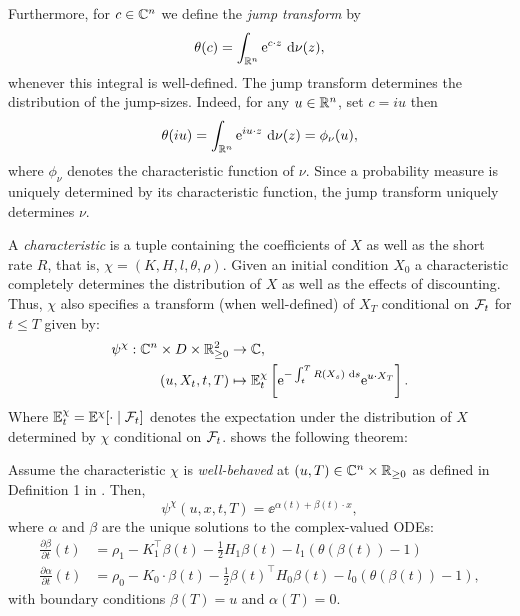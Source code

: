 Furthermore, for $c \in \mathbb{C}^{n}$ we define the \emph{jump transform} by
\begin{equation}
  \theta(c) = \int_{\mathbb{R}^{n}}
  \text{e}^{c \cdot z}\text{ d} \nu(z)
  \label{eq:jump-trans-def}
,\end{equation}
whenever this integral is well-defined. The jump transform determines the
distribution of the jump-sizes. Indeed, for any $u \in \mathbb{R}^n$, set $c = iu$ then 
\[
  \theta(iu)
  = \int_{\mathbb{R}^n} \text{e}^{iu \cdot z} \text{ d}\nu(z)
  = \phi_\nu(u),
\]
where $\phi_\nu$ denotes the characteristic function of $\nu$. Since a probability measure is
uniquely determined by its characteristic function, the jump transform uniquely determines $\nu$.

A \emph{characteristic} is a tuple containing the coefficients of $X$ as well as the short rate $R$,
that is, $\chi = (K, H, l, \theta, \rho)$. Given an initial condition $X_0$ a characteristic
completely determines the distribution of $X$ as well as the effects of discounting. Thus, $\chi$
also specifies a transform (when well-defined) of $X_T$ conditional on $\mathcal{F}_t$ for $t \le T$ given
by:
\begin{align*} 
  \psi^{\chi}: \mathbb{C}^{n} \times D \times  \mathbb{R}_{\ge 0}^{2} &\to  \mathbb{C},\\
  (u, X_t, t, T) &\mapsto  \mathbb{E}^{\chi}_t\left[ \text{e}^{-\int_{t}^{T} R(X_s) \text{ d} s}\text{e}^{u \cdot X_T} \right]
.\end{align*}
Where $\mathbb{E}^{\chi}_t = \mathbb{E}^{\chi}[\cdot \mid \mathcal{F}_t]$ denotes the expectation under the distribution of
$X$ determined by $\chi$ conditional on $\mathcal{F}_t$. \parencite{Duffie2000} shows the following theorem:
\begin{theorem}
  \label{th:ajd-cf-sol}
  Assume the characteristic $\chi$ is \emph{well-behaved} at $(u,T) \in \mathbb{C}^{n} \times \mathbb{R}_{\ge 0}$
  as defined in Definition 1 in \parencite{Duffie2000}. 
  Then,
  \[ 
    \psi^{\chi}(u, x, t, T) = \ee^{\alpha(t) + \beta(t) \cdot x}
  ,\]
 where $\alpha$ and $\beta$ are the unique solutions to the complex-valued ODEs:
  \begin{align*} 
    \frac{\partial \beta}{\partial t} (t) &= \rho_1 - K_1^{\top }\beta(t) - \frac{1}{2} H_1 \beta(t)
    - l_1 (\theta(\beta(t)) - 1)\\
    \frac{\partial \alpha}{\partial t} (t) &=  \rho_0 - K_0 \cdot \beta(t) - \frac{1}{2}
    \beta(t)^{\top }H_0 \beta(t) - l_0(\theta(\beta(t)) -1)
  ,\end{align*}
  with boundary conditions $\beta(T) = u$ and $\alpha(T) = 0$.
\end{theorem}
